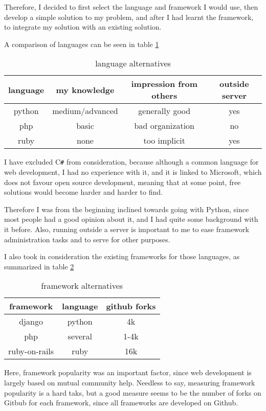 \documentclass[12pt]{article}
\begin{document}
Therefore, I decided to first select the language and framework I would use,
then develop a simple solution to my problem, and after I had learnt the framework,
to integrate my solution with an existing solution.

A comparison of languages can be seen in table \ref{tab1}

\begin{table}[h]
  \centering
  \begin{tabular}{cccc}
    language & my knowledge & impression from others & outside server \\  		    
		\hline
		python & medium/advanced & generally good & yes \\
    php & basic & bad organization & no \\
    ruby & none & too implicit & yes \\
  \end{tabular}
  \caption{language alternatives}
  \label{tab1}
\end{table}

I have excluded C\verb!#! from consideration, because although a common language for web
development, I had no experience with it, and it is linked to Microsoft, which
does not favour open source development, meaning that at some point, free solutions
would become harder and harder to find.

Therefore I was from the beginning inclined towards going with Python, since most people
had a good opinion about it, and I had quite some background with it before. Also,
running outside a server is important to me to ease framework administration tasks
and to serve for other purposes.

I also took in consideration the existing frameworks for those languages, as summarized in
table \ref{tab2}

\begin{table}[h]
  \centering
  \begin{tabular}{ccc}
    framework & language & github forks \\  		    
		\hline
		django \cite{DD12} & python & 4k \\
    php & several & 1-4k \\
    ruby-on-rails & ruby & 16k \\
  \end{tabular}
  \caption{framework alternatives}
  \label{tab2}
\end{table}

Here, framework popularity was an important factor, since web development
is largely based on mutual community help. Needless to say, measuring framework
popularity is a hard taks, but a good measure seems to be the number of forks
on Gitbub for each framework, since all frameworks are developed on Github.
\end{document}
